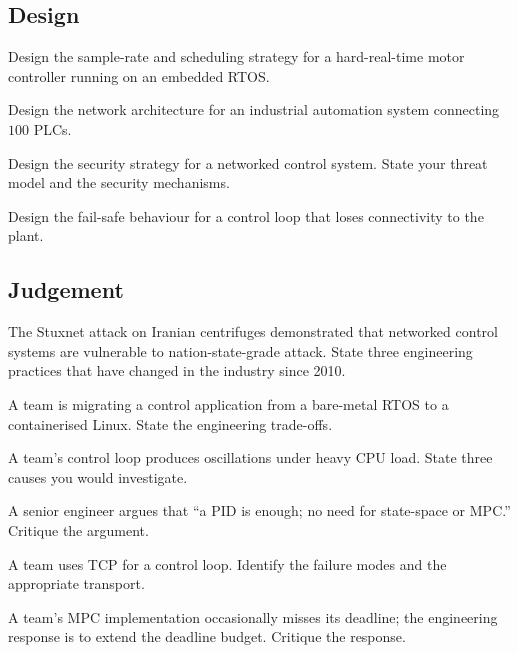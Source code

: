 \subsection*{Design}

\begin{exercise}
Design the sample-rate and scheduling strategy for a hard-real-time motor controller running on an embedded RTOS.
\end{exercise}

\begin{exercise}
Design the network architecture for an industrial automation system connecting $100$ PLCs.
\end{exercise}

\begin{exercise}
Design the security strategy for a networked control system. State your threat model and the security mechanisms.
\end{exercise}

\begin{exercise}
Design the fail-safe behaviour for a control loop that loses connectivity to the plant.
\end{exercise}

\subsection*{Judgement}

\begin{exercise}
The Stuxnet attack on Iranian centrifuges demonstrated that networked control systems are vulnerable to nation-state-grade attack. State three engineering practices that have changed in the industry since 2010.
\end{exercise}

\begin{exercise}
A team is migrating a control application from a bare-metal RTOS to a containerised Linux. State the engineering trade-offs.
\end{exercise}

\begin{exercise}
A team's control loop produces oscillations under heavy CPU load. State three causes you would investigate.
\end{exercise}

\begin{exercise}
A senior engineer argues that ``a PID is enough; no need for state-space or MPC.'' Critique the argument.
\end{exercise}

\begin{exercise}
A team uses TCP for a control loop. Identify the failure modes and the appropriate transport.
\end{exercise}

\begin{exercise}
A team's MPC implementation occasionally misses its deadline; the engineering response is to extend the deadline budget. Critique the response.
\end{exercise}
